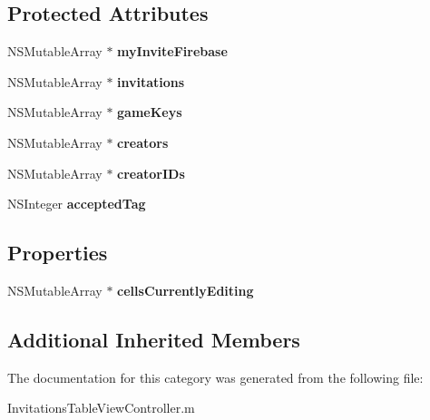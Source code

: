 \subsection*{Protected Attributes}
\begin{DoxyCompactItemize}
\item 
\hypertarget{category_invitations_table_view_controller_07_08_ae6487bc22398cd9a2885af077cbd14c4}{N\+S\+Mutable\+Array $\ast$ {\bfseries my\+Invite\+Firebase}}\label{category_invitations_table_view_controller_07_08_ae6487bc22398cd9a2885af077cbd14c4}

\item 
\hypertarget{category_invitations_table_view_controller_07_08_adb1ca17c34ceccfbeaa858b1eeacb33a}{N\+S\+Mutable\+Array $\ast$ {\bfseries invitations}}\label{category_invitations_table_view_controller_07_08_adb1ca17c34ceccfbeaa858b1eeacb33a}

\item 
\hypertarget{category_invitations_table_view_controller_07_08_a0313c0f610b31c48cefb2b512acd350d}{N\+S\+Mutable\+Array $\ast$ {\bfseries game\+Keys}}\label{category_invitations_table_view_controller_07_08_a0313c0f610b31c48cefb2b512acd350d}

\item 
\hypertarget{category_invitations_table_view_controller_07_08_a3bb2de8ba5bc2763ceb6f0a21a76e453}{N\+S\+Mutable\+Array $\ast$ {\bfseries creators}}\label{category_invitations_table_view_controller_07_08_a3bb2de8ba5bc2763ceb6f0a21a76e453}

\item 
\hypertarget{category_invitations_table_view_controller_07_08_a1a5f7b532ff25ece0457fdc51352b57c}{N\+S\+Mutable\+Array $\ast$ {\bfseries creator\+I\+Ds}}\label{category_invitations_table_view_controller_07_08_a1a5f7b532ff25ece0457fdc51352b57c}

\item 
\hypertarget{category_invitations_table_view_controller_07_08_a9cb9f08f5ce942edc55484e2ddfb2bc8}{N\+S\+Integer {\bfseries accepted\+Tag}}\label{category_invitations_table_view_controller_07_08_a9cb9f08f5ce942edc55484e2ddfb2bc8}

\end{DoxyCompactItemize}
\subsection*{Properties}
\begin{DoxyCompactItemize}
\item 
\hypertarget{category_invitations_table_view_controller_07_08_a1f3a43bce750936081c649eb0feb54ba}{N\+S\+Mutable\+Array $\ast$ {\bfseries cells\+Currently\+Editing}}\label{category_invitations_table_view_controller_07_08_a1f3a43bce750936081c649eb0feb54ba}

\end{DoxyCompactItemize}
\subsection*{Additional Inherited Members}


The documentation for this category was generated from the following file\+:\begin{DoxyCompactItemize}
\item 
Invitations\+Table\+View\+Controller.\+m\end{DoxyCompactItemize}
